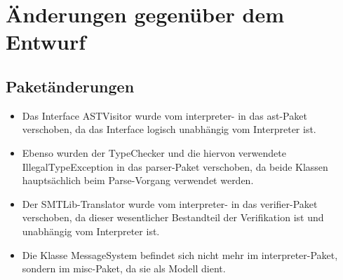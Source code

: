 \section{\"{A}nderungen gegen\"{u}ber dem Entwurf}

\subsection{Paket\"{a}nderungen}
\begin{itemize}
  \item Das Interface ASTVisitor wurde vom interpreter- in das ast-Paket verschoben, da das Interface logisch unabh\"{a}ngig vom Interpreter ist.
  \item Ebenso wurden der TypeChecker und die hiervon verwendete IllegalTypeException in das parser-Paket verschoben, da beide Klassen haupts\"{a}chlich beim Parse-Vorgang verwendet werden.
  \item Der SMTLib-Translator wurde vom interpreter- in das verifier-Paket verschoben, da dieser wesentlicher Bestandteil der Verifikation ist und unabh\"{a}ngig vom Interpreter ist.
  \item Die Klasse MessageSystem befindet sich nicht mehr im interpreter-Paket, sondern im misc-Paket, da sie als Modell dient.
\end{itemize}

